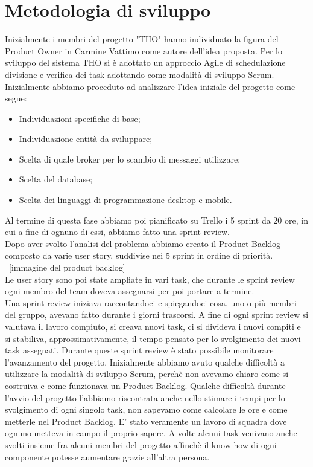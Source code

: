 \documentclass[12pt, italian]{article}
\begin{document}
\section{Metodologia di sviluppo}
Inizialmente i membri del progetto "THO" hanno individuato la figura del Product Owner in Carmine Vattimo come autore dell'idea proposta. Per lo sviluppo del sistema THO si è adottato un approccio Agile di schedulazione divisione e verifica dei task adottando come modalità di sviluppo Scrum. 
\\ Inizialmente abbiamo proceduto ad analizzare l'idea iniziale del progetto come segue:
\begin{itemize}
	\item Individuazioni specifiche di base;
	\item Individuazione entità da sviluppare;
	\item Scelta di quale broker per lo scambio di messaggi utilizzare;
	\item Scelta del database;
	\item Scelta dei linguaggi di programmazione desktop e mobile.
\end{itemize}

Al termine di questa fase abbiamo poi pianificato su Trello i 5 sprint da 20 ore, in cui a fine di ognuno di essi, abbiamo fatto una sprint review.\\Dopo aver svolto l'analisi del problema abbiamo creato il Product Backlog composto da varie user story, suddivise nei 5 sprint in ordine di priorità. \\

{\ [immagine del product backlog]}\\

Le user story sono poi state ampliate in vari task, che durante le sprint review ogni membro del team doveva assegnarsi per poi portare a termine. \\Una sprint review iniziava raccontandoci e spiegandoci cosa, uno o più membri del gruppo, avevano fatto durante i giorni trascorsi. A fine di ogni sprint review si valutava il lavoro compiuto, si creava nuovi task, ci si divideva i nuovi compiti e si stabiliva, approssimativamente, il tempo pensato per lo svolgimento dei nuovi task assegnati. Durante queste sprint review è stato possibile monitorare l'avanzamento del progetto. Inizialmente abbiamo avuto qualche difficoltà a utilizzare la modalità di sviluppo Scrum, perchè non avevamo chiaro come si costruiva e come funzionava un Product Backlog. Qualche difficoltà durante l'avvio del progetto l'abbiamo riscontrata anche nello stimare i tempi per lo svolgimento di ogni singolo task, non sapevamo come calcolare le ore e come metterle nel Product Backlog. E' stato veramente un lavoro di squadra dove ognuno metteva in campo il proprio sapere. A volte alcuni task venivano anche svolti insieme fra alcuni membri del progetto affinchè il know-how di ogni componente potesse aumentare grazie all'altra persona.
\end{document}
